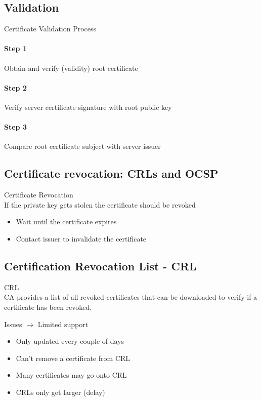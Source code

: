\subsection{Validation}

\begin{KR}{Certificate Validation Process}\\
    \paragraph{Step 1} Obtain and verify (validity) root certificate
    \paragraph{Step 2} Verify server certificate signature with root public key
    \paragraph{Step 3} Compare root certificate subject with server issuer
\end{KR}

\subsection{Certificate revocation: CRLs and OCSP}

\begin{concept}{Certificate Revocation}\\
    If the private key gets stolen the certificate should be revoked
    \begin{itemize}
        \item Wait until the certificate expires
        \item Contact issuer to invalidate the certificate
    \end{itemize}
\end{concept}

\subsection{Certification Revocation List - CRL}

\begin{definition}{CRL}\\
    CA provides a list of all revoked certificates that can be downloaded to verify if a certificate has been revoked.
    
    Issues $\rightarrow$ Limited support
    \begin{itemize}
        \item Only updated every couple of days
        \item Can't remove a certificate from CRL
        \item Many certificates may go onto CRL
        \item CRLs only get larger (delay)
    \end{itemize}
\end{definition}

